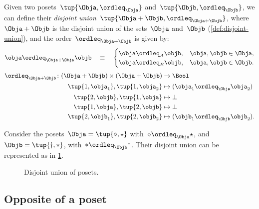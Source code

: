 \begin{definition}
  Given two posets~$\tup{\Obja, \ordleq_\Obja} $ and~$\tup{\Objb, \ordleq_\Objb}$, we can define their \emph{disjoint union}~$\tup{\Obja + \Objb, \ordleq_{\Obja + \Objb}}$, where~$\Obja + \Objb$
  is the disjoint union of the sets~$\Obja$ and~$\Objb$ (\cref{def:disjoint-union}), and the
  order~$\ordleq_{\Obja + \Objb}$ is given by:
  \begin{equation}
    \obja \ordleq_{\Obja + \Obja} \objb \quad\equiv\quad
    \begin{cases}
      \obja \ordleq_A \objb, & \obja,\objb \in \Obja, \\
      \obja \ordleq_B \objb, & \obja,\objb \in \Objb.
    \end{cases}
  \end{equation}
  \begin{equation}
    \begin{aligned}
      \ordleq_{\Obja+\Objb}\colon (\Obja+\Objb)\times (\Obja+\Objb)&\to \Bool\\
      \tup{1,\obja_1},\tup{1,\obja_2}&\mapsto (\obja_1\ordleq_{\Obja} \obja_2)\\
      \tup{2,\objb},\tup{1,\obja}&\mapsto \bot\\
      \tup{1,\obja},\tup{2,\objb}&\mapsto \bot\\
      \tup{2,\objb_1},\tup{2,\objb_2}&\mapsto (\objb_1\ordleq_\Objb \objb_2).
    \end{aligned}
  \end{equation}
\end{definition}


\begin{example}
  Consider the posets~$\Obja=\tup{\diamond, \star}$ with~$\diamond \ordleq_\Obja \star$, and~$\Objb=\tup{\dagger,\ast}$, with~$\ast \ordleq_\Objb \dagger$. Their disjoint union can be represented as in \cref{fig:poset-coproduct}.

  \begin{figure}[h!]
    \centering
    \caption{Disjoint union of posets. \label{fig:poset-coproduct}}
  \end{figure}
\end{example}

\subsection{Opposite of a poset}\label{subsec:opposite-of-a-poset}

